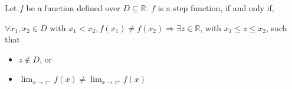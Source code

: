 \documentclass{article}
\begin{document}
Let $f$ be a function defined over $D \subseteq \mathbb{R}$.  $f$ is a step function, if and only if, 
\vspace{0.5cm}

$\forall x_1, x_2 \in D$ with $x_1 < x_2, f(x_1) \neq f(x_2) \Rightarrow \exists z \in \mathbb{R}$, with $x_1 \leq z \leq x_2$, such that

\begin{itemize}
	\item $z \not\in D$, or
	\item $\lim_{x \to z^{-}} f(x) \neq  \lim_{x \to z^{+}} f(x)$
\end{itemize}
\end{document}
